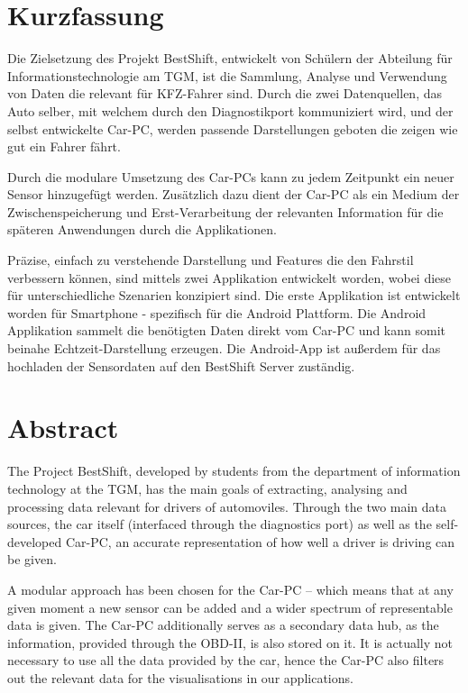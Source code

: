 \section*{Kurzfassung}

Die Zielsetzung des Projekt BestShift, entwickelt von Schülern der Abteilung für Informationstechnologie am TGM, ist die Sammlung, Analyse und Verwendung von Daten die relevant für KFZ-Fahrer sind. Durch die zwei Datenquellen, das Auto selber, mit welchem durch den Diagnostikport kommuniziert wird, und der selbst entwickelte Car-PC, werden passende Darstellungen geboten die zeigen wie gut ein Fahrer fährt.

Durch die modulare Umsetzung des Car-PCs kann zu jedem Zeitpunkt ein neuer Sensor hinzugefügt werden. Zusätzlich dazu dient der Car-PC als ein Medium der Zwischenspeicherung und Erst-Verarbeitung der relevanten Information für die späteren Anwendungen durch die Applikationen.

Präzise, einfach zu verstehende Darstellung und Features die den Fahrstil verbessern können, sind mittels zwei Applikation entwickelt worden, wobei diese für unterschiedliche Szenarien konzipiert sind. Die erste Applikation ist entwickelt worden für Smartphone - spezifisch für die Android Plattform. Die Android Applikation sammelt die benötigten Daten direkt vom Car-PC und kann somit beinahe Echtzeit-Darstellung erzeugen. Die Android-App ist außerdem für das hochladen der Sensordaten auf den BestShift Server zuständig.

\todo

\section*{Abstract}
The Project BestShift, developed by students from the department of information technology at the TGM, has the main goals of extracting, analysing and processing data relevant for drivers of automoviles. Through the two main data sources, the car itself (interfaced through the diagnostics port) as well as the self-developed Car-PC, an accurate representation of how well a driver is driving can be given.

A modular approach has been chosen for the Car-PC – which means that at any given moment a new sensor can be added and a wider spectrum of representable data is given. The Car-PC additionally serves as a secondary data hub, as the information, provided through the OBD-II, is also stored on it. It is actually not necessary to use all the data provided by the car, hence the Car-PC also filters out the relevant data for the visualisations in our applications.

